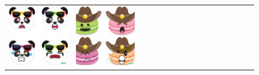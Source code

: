 \begin{figure}[ht!]
\begin{adjustwidth}{-0.8in}{-0.5in}
\begin{tabular}{cccccccccccccccccccc}
\multicolumn{3}{c}{\includegraphics[width=\twobytwocolwidth\textwidth]{figures/cherries/emoji_panda.jpg}} &
\multicolumn{3}{c}{\includegraphics[width=\twobytwocolwidth\textwidth]{figures/cherries/emoji_macarons.jpg}} &&

\end{tabular}
\end{adjustwidth}
\end{figure}
